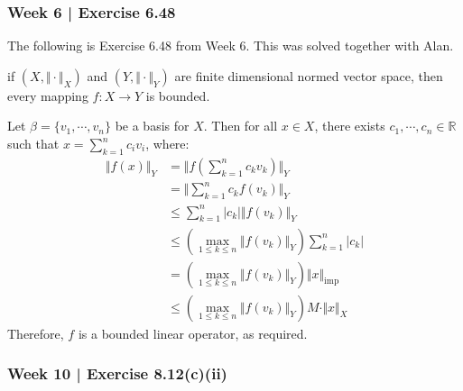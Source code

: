 \newpage
\subsubsection{Week 6 | Exercise 6.48}

The following is Exercise 6.48 from Week 6.
This was solved together with Alan.

\begin{exr}[num=6.48]
     if $(X, \Vert \cdot \Vert_X)$ and $(Y, \Vert \cdot
    \Vert_Y)$ are finite dimensional normed vector space, then every mapping
    $f : X \rightarrow Y$ is bounded.
\end{exr}

\begin{pf}[source=Alan]
    Let $\beta = \{v_1,\cdots,v_n\}$ be a basis for $X$.
    Then for all $x \in X$, there exists $c_1,\cdots,c_n \in \mathbb{R}$ such
    that $x = \sum_{k=1}^n c_iv_i$, where:
    \begin{align*}
        \Vert f(x) \Vert_Y &= \Vert f(\sum_{k=1}^n c_kv_k) \Vert_Y \\
        &= \Vert \sum_{k=1}^n c_kf(v_k) \Vert_Y \\
        &\leq  \sum_{k=1}^n |c_k| \Vert f(v_k) \Vert_Y \\
        &\leq (\max_{1 \leq k \leq n} \Vert f(v_k) \Vert_Y) \sum_{k=1}^n |c_k| \\
        &= (\max_{1 \leq k \leq n} \Vert f(v_k) \Vert_Y) \Vert x
        \Vert_{\text{imp}} \\
        &\leq (\max_{1 \leq k \leq n} \Vert f(v_k) \Vert_Y) M
        \cdot \Vert x \Vert_X
    \end{align*}
    Therefore, $f$ is a bounded linear operator, as required.
\end{pf}

\newpage
\subsubsection{Week 10 | Exercise 8.12(c)(ii)}

